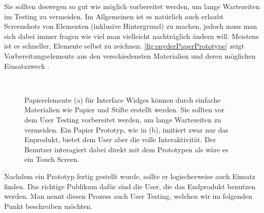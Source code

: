 \medskip Sie sollten deswegen so gut wie möglich vorbereitet werden, um lange Wartezeiten im Testing zu vermeiden. Im Allgemeinen ist es natürlich auch erlaubt Screenshots von Elementen (inklusive Hintergrund) zu machen, jedoch muss man sich dabei immer fragen wie viel man vielleicht nachträglich ändern will. Meistens ist es schneller, Elemente selbst zu zeichnen. \autoref{fig:snyderPaperPrototype} zeigt Vorbereitungselemente aus den verschiedensten Materialien und deren möglichen Einsatzzweck \citep{Snyder:2003}.

\begin{figure}
	\myfloatalign
	 \quad
	 \\
	\caption[Paper Prototyping \newline \citep{Sagmeister:2008}]{Papierelemente (a) für Interface Widges können durch einfache Materialien wie Papier und Stifte erstellt werden. Sie sollten vor dem User Testing vorbereitet werden, um lange Wartezeiten zu vermeiden. Ein Papier Prototyp, wie in (b), imitiert zwar nur das Enprodukt, bietet dem User aber die volle Interaktivität. Der Benutzer interagiert dabei direkt mit dem Prototypen als wäre es ein Touch Screen.}\label{fig:snyderPaperPrototype}
\end{figure}

\medskip Nachdem ein Prototyp fertig gestellt wurde, sollte er logischerweise auch Einsatz finden. Das richtige Publikum dafür sind die User, die das Endprodukt benutzen werden. Man nennt diesen Prozess auch User Testing, welchen wir im folgenden Punkt beschreiben möchten.

